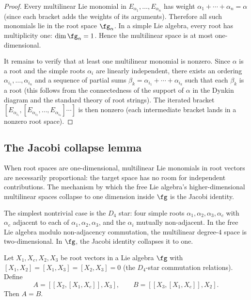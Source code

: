 \begin{proof}
Every multilinear Lie monomial in $E_{\alpha_1},\ldots,E_{\alpha_n}$
has weight $\alpha_1+\cdots+\alpha_n=\alpha$ (since each bracket
adds the weights of its arguments). Therefore all such monomials
lie in the root space $\fg_\alpha$. In a simple Lie algebra, every
root has multiplicity one: $\dim\fg_\alpha=1$. Hence the
multilinear space is at most one-dimensional.

It remains to verify that at least one multilinear monomial is
nonzero. Since $\alpha$ is a root and the simple roots $\alpha_i$ are
linearly independent, there exists an ordering
$\alpha_{i_1},\ldots,\alpha_{i_n}$ and a sequence of partial sums
$\beta_k=\alpha_{i_1}+\cdots+\alpha_{i_k}$ such that each $\beta_k$
is a root (this follows from the connectedness of the support of
$\alpha$ in the Dynkin diagram and the standard theory of root
strings). The iterated bracket
$[E_{\alpha_{i_1}},[E_{\alpha_{i_2}},\ldots,E_{\alpha_{i_n}}]\cdots]$
is then nonzero (each intermediate bracket lands in a nonzero root
space).
\end{proof}

\subsection{The Jacobi collapse lemma}

When root spaces are one-dimensional, multilinear Lie monomials
in root vectors are necessarily proportional: the target space
has no room for independent contributions. The mechanism by
which the free Lie algebra's higher-dimensional multilinear spaces
collapse to one dimension inside $\fg$ is the Jacobi identity.

The simplest nontrivial case is the $D_4$ star: four simple roots
$\alpha_1,\alpha_2,\alpha_3,\alpha_c$ with $\alpha_c$ adjacent to
each of $\alpha_1,\alpha_2,\alpha_3$, and the $\alpha_i$ mutually
non-adjacent. In the free Lie algebra modulo non-adjacency
commutation, the multilinear degree-$4$ space is two-dimensional.
In $\fg$, the Jacobi identity collapses it to one.

\begin{lemma}
\label{lem:jacobi-collapse-v1}
Let $X_1,X_c,X_2,X_3$ be root vectors in a Lie algebra $\fg$ with
$[X_1,X_2]=[X_1,X_3]=[X_2,X_3]=0$ (the $D_4$-star commutation
relations). Define
\[
A = [[X_2,[X_1,X_c]],X_3],
\qquad
B = [[X_3,[X_1,X_c]],X_2].
\]
Then $A=B$.
\end{lemma}

